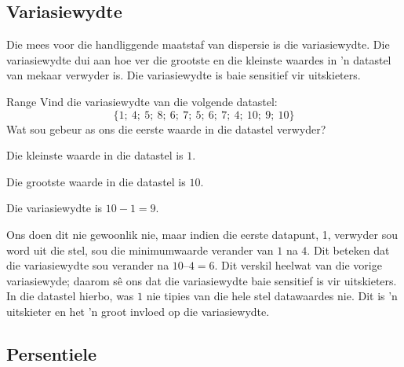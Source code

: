 \subsection{Variasiewydte}

Die mees voor die handliggende  maatstaf van dispersie is die variasiewydte. Die variasiewydte dui aan hoe ver die grootste en die kleinste waardes in ’n datastel van mekaar verwyder is. Die variasiewydte is baie sensitief vir uitskieters.

\begin{wex}{Range}
{Vind die variasiewydte van die volgende datastel:
    \begin{equation*}
      \{1;\ 4;\ 5;\ 8;\ 6;\ 7;\ 5;\ 6;\ 7;\ 4;\ 10;\ 9;\ 10\}
    \end{equation*}
    Wat sou gebeur as ons die eerste waarde in die datastel verwyder?
}{
  Die kleinste waarde in die datastel is $1$.

  Die grootste waarde in die datastel is $10$.

  Die variasiewydte is $10-1=9$.

  Ons doen dit nie gewoonlik nie, maar indien die eerste datapunt, 1, verwyder sou word uit die stel, sou die minimumwaarde verander van $1$ na $4$. Dit beteken dat die variasiewydte sou verander na $10 – 4 = 6$. Dit verskil heelwat van die vorige variasiewyde; daarom sê ons dat die variasiewydte baie sensitief is vir uitskieters. In die datastel hierbo, was $1$ nie tipies van die hele stel datawaardes nie. Dit is ’n uitskieter en het ’n groot invloed op die variasiewydte. 
}
\end{wex}


\subsection{Persentiele}


